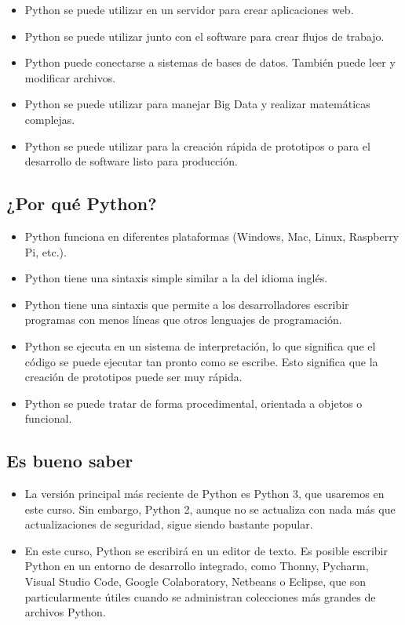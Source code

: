 \begin{itemize}
  \item Python se puede utilizar en un servidor para crear aplicaciones web.
  \item Python se puede utilizar junto con el software para crear flujos de trabajo.
  \item Python puede conectarse a sistemas de bases de datos. También puede
    leer y modificar archivos.
  \item Python se puede utilizar para manejar Big Data y realizar matemáticas
    complejas.
  \item Python se puede utilizar para la creación rápida de prototipos o para
    el desarrollo de software listo para producción.
\end{itemize}

\subsection{¿Por qué Python?}\label{por-quuxe9-python}

\begin{itemize}
  \item Python funciona en diferentes plataformas (Windows, Mac, Linux,
    Raspberry Pi, etc.).
  \item Python tiene una sintaxis simple similar a la del idioma inglés.
  \item Python tiene una sintaxis que permite a los desarrolladores escribir
    programas con menos líneas que otros lenguajes de programación.
  \item Python se ejecuta en un sistema de interpretación, lo que significa
    que el código se puede ejecutar tan pronto como se escribe. Esto
    significa que la creación de prototipos puede ser muy rápida.
  \item Python se puede tratar de forma procedimental, orientada a objetos o
    funcional.
\end{itemize}

\subsection{Es bueno saber}\label{es-bueno-saber}

\begin{itemize}
\item
  La versión principal más reciente de Python es Python 3, que usaremos
  en este curso. Sin embargo, Python 2, aunque no se actualiza con nada
  más que actualizaciones de seguridad, sigue siendo bastante popular.
\item
  En este curso, Python se escribirá en un editor de texto. Es posible
  escribir Python en un entorno de desarrollo integrado, como Thonny,
  Pycharm, Visual Studio Code, Google Colaboratory, Netbeans o Eclipse,
  que son particularmente útiles cuando se administran colecciones más
  grandes de archivos Python.
\end{itemize}

